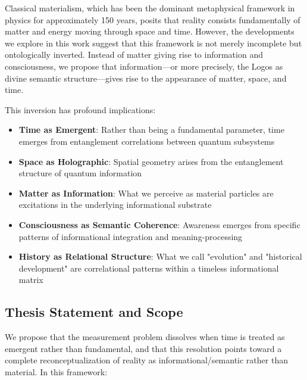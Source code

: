 \documentclass[12pt,a4paper]{article}
\begin{document}
Classical materialism, which has been the dominant metaphysical framework in physics for approximately 150 years, posits that reality consists fundamentally of matter and energy moving through space and time. However, the developments we explore in this work suggest that this framework is not merely incomplete but ontologically inverted. Instead of matter giving rise to information and consciousness, we propose that information—or more precisely, the Logos as divine semantic structure—gives rise to the appearance of matter, space, and time.

This inversion has profound implications:

\begin{itemize}
    \item \textbf{Time as Emergent}: Rather than being a fundamental parameter, time emerges from entanglement correlations between quantum subsystems
    \item \textbf{Space as Holographic}: Spatial geometry arises from the entanglement structure of quantum information
    \item \textbf{Matter as Information}: What we perceive as material particles are excitations in the underlying informational substrate
    \item \textbf{Consciousness as Semantic Coherence}: Awareness emerges from specific patterns of informational integration and meaning-processing
    \item \textbf{History as Relational Structure}: What we call "evolution" and "historical development" are correlational patterns within a timeless informational matrix
\end{itemize}

\subsection{Thesis Statement and Scope}

We propose that the measurement problem dissolves when time is treated as emergent rather than fundamental, and that this resolution points toward a complete reconceptualization of reality as informational/semantic rather than material. In this framework:
\end{document}
